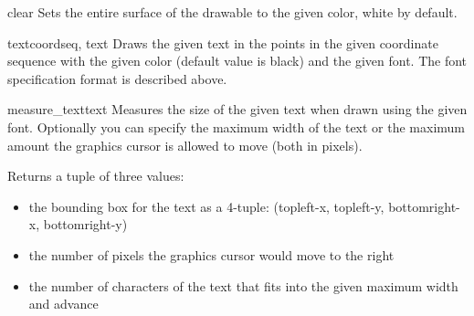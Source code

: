 \begin{methoddesc}{clear}{}
Sets the entire surface of the drawable to the given color, white by 
default.
\end{methoddesc}

\begin{methoddesc}{text}{coordseq, text}
Draws the given text in the points in the given coordinate sequence
with the given color (default value is black) and the given font. The
font specification format is described above.
\end{methoddesc}

\begin{methoddesc}{measure_text}{text}
Measures the size of the given text when drawn using the given
font. Optionally you can specify the maximum width of the text or the
maximum amount the graphics cursor is allowed to move (both in pixels).

Returns a tuple of three values: 
\begin{itemize}
\item the bounding box for the text as a 4-tuple: (topleft-x, topleft-y, bottomright-x, bottomright-y)
\item the number of pixels the graphics cursor would move to the right
\item the number of characters of the text that fits into the given maximum width and advance
\end{itemize}
\end{methoddesc}

